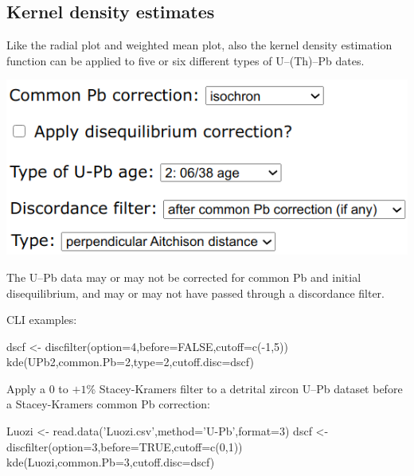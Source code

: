 \begin{refsection}

\section{Kernel density estimates}
\label{sec:UPbKDE}

Like the radial plot and weighted mean plot, also the kernel density
estimation function can be applied to five or six different types of
U--(Th)--Pb dates.\\

\noindent\begin{minipage}[t]{.5\linewidth}
\strut\vspace*{-\baselineskip}\newline
\includegraphics[width=\linewidth]{../figures/UPbKDEsettings.png}\\
\end{minipage}
\begin{minipage}[t]{.5\linewidth}
 The U--Pb data may or may not be corrected for common Pb and initial
 disequilibrium, and may or may not have passed through a discordance
 filter.\\
\end{minipage}

CLI examples:

\begin{script}
dscf <- discfilter(option=4,before=FALSE,cutoff=c(-1,5))
kde(UPb2,common.Pb=2,type=2,cutoff.disc=dscf)
\end{script}

\noindent Apply a $0$ to $+1$\% Stacey-Kramers filter to a detrital
zircon U--Pb dataset before a Stacey-Kramers common Pb correction:
\begin{script}
Luozi <- read.data('Luozi.csv',method='U-Pb',format=3)
dscf <- discfilter(option=3,before=TRUE,cutoff=c(0,1))
kde(Luozi,common.Pb=3,cutoff.disc=dscf)
\end{script}


\end{refsection}
